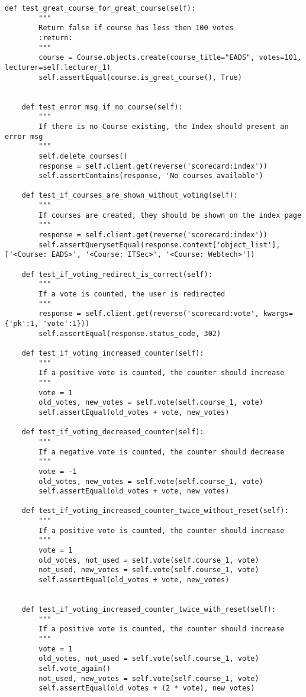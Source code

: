\begin{lstlisting}[style=Python, caption=scorecard/tests.py, label=lst:tests.py]
    def test_great_course_for_great_course(self):
        """
        Return false if course has less then 100 votes
        :return:
        """
        course = Course.objects.create(course_title="EADS", votes=101, lecturer=self.lecturer_1)
        self.assertEqual(course.is_great_course(), True)


    def test_error_msg_if_no_course(self):
        """
        If there is no Course existing, the Index should present an error msg
        """
        self.delete_courses()
        response = self.client.get(reverse('scorecard:index'))
        self.assertContains(response, 'No courses available')

    def test_if_courses_are_shown_without_voting(self):
        """
        If courses are created, they should be shown on the index page
        """
        response = self.client.get(reverse('scorecard:index'))
        self.assertQuerysetEqual(response.context['object_list'], ['<Course: EADS>', '<Course: ITSec>', '<Course: Webtech>'])

    def test_if_voting_redirect_is_correct(self):
        """
        If a vote is counted, the user is redirected
        """
        response = self.client.get(reverse('scorecard:vote', kwargs={'pk':1, 'vote':1}))
        self.assertEqual(response.status_code, 302)

    def test_if_voting_increased_counter(self):
        """
        If a positive vote is counted, the counter should increase
        """
        vote = 1
        old_votes, new_votes = self.vote(self.course_1, vote)
        self.assertEqual(old_votes + vote, new_votes)

    def test_if_voting_decreased_counter(self):
        """
        If a negative vote is counted, the counter should decrease
        """
        vote = -1
        old_votes, new_votes = self.vote(self.course_1, vote)
        self.assertEqual(old_votes + vote, new_votes)

    def test_if_voting_increased_counter_twice_without_reset(self):
        """
        If a positive vote is counted, the counter should increase
        """
        vote = 1
        old_votes, not_used = self.vote(self.course_1, vote)
        not_used, new_votes = self.vote(self.course_1, vote)
        self.assertEqual(old_votes + vote, new_votes)


    def test_if_voting_increased_counter_twice_with_reset(self):
        """
        If a positive vote is counted, the counter should increase
        """
        vote = 1
        old_votes, not_used = self.vote(self.course_1, vote)
        self.vote_again()
        not_used, new_votes = self.vote(self.course_1, vote)
        self.assertEqual(old_votes + (2 * vote), new_votes)



\end{lstlisting}
